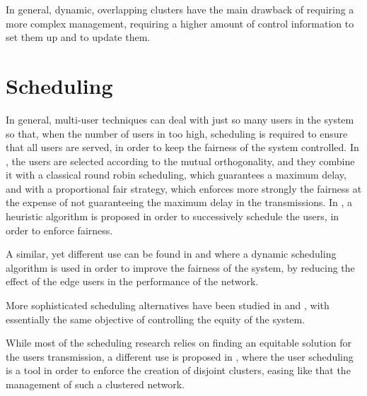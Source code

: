In general, dynamic, overlapping clusters have the main drawback of requiring a
more complex management, requiring a higher amount of control information to set
them up and to update them.


\section{Scheduling} \label{sec:sa_sched}

In general, multi-user techniques can deal with just so many users in the system so that, when the number of users in too high, scheduling is required to ensure
that all users are served, in order to keep the fairness of the system
controlled. In \cite{yoo06}, the users are selected according to the mutual
orthogonality, and they combine it with a classical round robin scheduling,
which guarantees a maximum delay, and with a proportional fair strategy, which
enforces more strongly the fairness at the expense of not guaranteeing the
maximum delay in the transmissions. In \cite{moon13}, a heuristic algorithm is
proposed in order to successively schedule the users, in order to enforce
fairness. 

A similar, yet different use can be found in \cite{papadogiannis08} and
\cite{kaviani10} where a dynamic scheduling algorithm is used in order to
improve the fairness of the system, by reducing the effect of the edge users in
the performance of the network.

More sophisticated scheduling alternatives have been studied in \cite{yi11} and
\cite{ko12}, with essentially the same objective of controlling the equity of
the system.

While most of the scheduling research relies on finding an equitable solution
for the users transmission, a different use is proposed in \cite{baracca12},
where the user scheduling is a tool in order to enforce the creation of disjoint
clusters, easing like that the management of such a clustered network.

